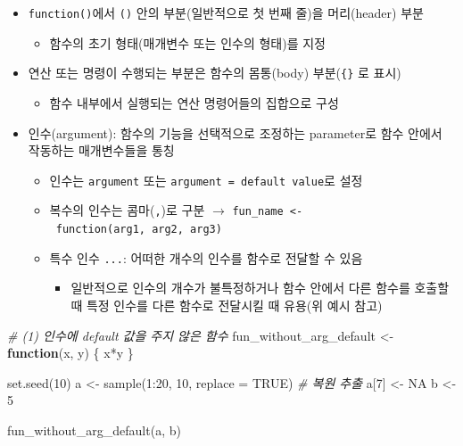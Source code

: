 \documentclass[
  11pt,
]{krantz}
\newenvironment{Shaded}{\begin{snugshade}}{\end{snugshade}}
\newcommand{\AttributeTok}[1]{\textcolor[rgb]{0.61,0.61,0.61}{#1}}
\newcommand{\CommentTok}[1]{\textcolor[rgb]{0.37,0.37,0.37}{\textit{#1}}}
\newcommand{\ConstantTok}[1]{\textcolor[rgb]{0,0,0}{#1}}
\newcommand{\ControlFlowTok}[1]{\textcolor[rgb]{0.27,0.27,0.27}{\textbf{#1}}}
\newcommand{\DecValTok}[1]{\textcolor[rgb]{0.06,0.06,0.06}{#1}}
\newcommand{\FunctionTok}[1]{\textcolor[rgb]{0,0,0}{#1}}
\newcommand{\NormalTok}[1]{#1}
\newcommand{\OtherTok}[1]{\textcolor[rgb]{0.37,0.37,0.37}{#1}}
\newcommand{\SpecialCharTok}[1]{\textcolor[rgb]{0,0,0}{#1}}
\providecommand{\tightlist}{%
  \setlength{\itemsep}{0pt}\setlength{\parskip}{0pt}}
\begin{document}
\normalsize

\begin{itemize}
\tightlist
\item
  \texttt{function()}에서 \texttt{()} 안의 부분(일반적으로 첫 번째 줄)을 머리(header) 부분

  \begin{itemize}
  \tightlist
  \item
    함수의 초기 형태(매개변수 또는 인수의 형태)를 지정
  \end{itemize}
\item
  연산 또는 명령이 수행되는 부분은 함수의 몸통(body) 부분(\texttt{\{\}} 로 표시)

  \begin{itemize}
  \tightlist
  \item
    함수 내부에서 실행되는 연산 명령어들의 집합으로 구성
  \end{itemize}
\item
  인수(argument): 함수의 기능을 선택적으로 조정하는 parameter로 함수 안에서 작동하는 매개변수들을 통칭

  \begin{itemize}
  \tightlist
  \item
    인수는 \texttt{argument} 또는 \texttt{argument\ =\ default\ value}로 설정
  \item
    복수의 인수는 콤마(\texttt{,})로 구분 \(\rightarrow\) \texttt{fun\_name\ \textless{}-\ function(arg1,\ arg2,\ arg3)}
  \item
    특수 인수 \texttt{...}: 어떠한 개수의 인수를 함수로 전달할 수 있음

    \begin{itemize}
    \tightlist
    \item
      일반적으로 인수의 개수가 불특정하거나 함수 안에서 다른 함수를 호출할 때 특정 인수를 다른 함수로 전달시킬 때 유용(위 예시 참고)
    \end{itemize}
  \end{itemize}
\end{itemize}

\footnotesize

\begin{Shaded}
\begin{Highlighting}[]
\CommentTok{\# (1) 인수에 default 값을 주지 않은 함수}
\NormalTok{fun\_without\_arg\_default }\OtherTok{\textless{}{-}} \ControlFlowTok{function}\NormalTok{(x, y) \{}
\NormalTok{  x}\SpecialCharTok{*}\NormalTok{y}
\NormalTok{\}}

\FunctionTok{set.seed}\NormalTok{(}\DecValTok{10}\NormalTok{)}
\NormalTok{a }\OtherTok{\textless{}{-}} \FunctionTok{sample}\NormalTok{(}\DecValTok{1}\SpecialCharTok{:}\DecValTok{20}\NormalTok{, }\DecValTok{10}\NormalTok{, }\AttributeTok{replace =} \ConstantTok{TRUE}\NormalTok{) }\CommentTok{\# 복원 추출}
\NormalTok{a[}\DecValTok{7}\NormalTok{] }\OtherTok{\textless{}{-}} \ConstantTok{NA}
\NormalTok{b }\OtherTok{\textless{}{-}} \DecValTok{5}

\FunctionTok{fun\_without\_arg\_default}\NormalTok{(a, b)}
\end{Highlighting}
\end{Shaded}
\end{document}
